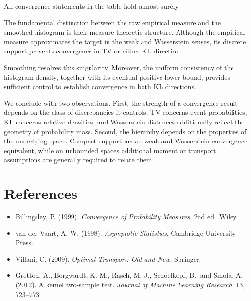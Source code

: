 \documentclass[
  11pt,
  a4paper,
  notitlepage
]{report}
\providecommand{\tightlist}{
  \setlength{\itemsep}{0pt}
  \setlength{\parskip}{0pt}
}
\begin{document}
All convergence statements in the table hold
almost surely.

The fundamental distinction between the raw
empirical measure and the smoothed histogram is
their measure-theoretic structure. Although the
empirical measure approximates the target in the
weak and Wasserstein senses, its discrete support
prevents convergence in TV or either KL direction.

Smoothing resolves this singularity. Moreover,
the uniform consistency of the histogram density,
together with its eventual positive lower bound,
provides sufficient control to establish
convergence in both KL directions.

We conclude with two observations. First,
the strength of a convergence result depends
on the class of discrepancies it controls:
TV concerns event probabilities, KL concerns
relative densities, and Wasserstein distances
additionally reflect the geometry of probability
mass. Second, the hierarchy depends on the
properties of the underlying space. Compact
support makes weak and Wasserstein convergence
equivalent, while on unbounded spaces additional
moment or transport assumptions are generally
required to relate them.

\section{References}\label{references}

\begin{itemize}
\tightlist
\item
  Billingsley, P. (1999). \emph{Convergence of Probability Measures},
  2nd ed.~Wiley.
\item
  van der Vaart, A. W. (1998). \emph{Asymptotic Statistics}. Cambridge
  University Press.
\item
  Villani, C. (2009). \emph{Optimal Transport: Old and New}. Springer.
\item
  Gretton, A., Borgwardt, K. M., Rasch, M. J., Schoelkopf, B., and
  Smola, A. (2012). A kernel two-sample test. \emph{Journal of Machine
  Learning Research}, 13, 723--773.
\end{itemize}
\end{document}
